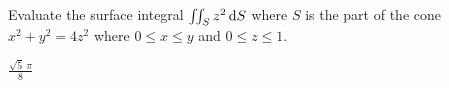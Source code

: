 
\begin{question}[M317 2016D] %
Evaluate the surface integral $\iint_S z^2\,\mathrm{d}S$ where $S$ is the 
part of the cone $x^2+y^2=4z^2$ where $0 \le x \le y$ and $0 \le z \le 1$.
\end{question}

%

\begin{answer} 
$\frac{\sqrt{5}\ \pi}{8}$
\end{answer}

